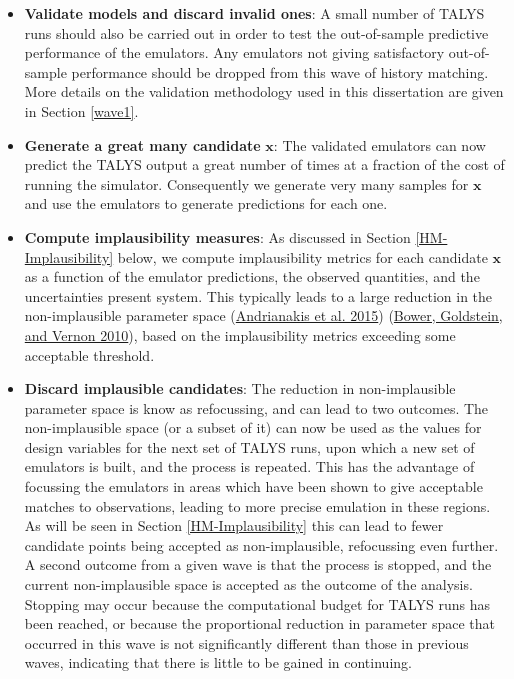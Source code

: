 \documentclass[
  12pt,
  a4paper,
  twoside]{book}
\begin{document}
\begin{itemize}
\item
  \textbf{Validate models and discard invalid ones}: A small number of TALYS runs should also be carried out in order to test the out-of-sample predictive performance of the emulators. Any emulators not giving satisfactory out-of-sample performance should be dropped from this wave of history matching. More details on the validation methodology used in this dissertation are given in Section \ref{wave1}.
\item
  \textbf{Generate a great many candidate} \(\mathbf{x}\): The validated emulators can now predict the TALYS output a great number of times at a fraction of the cost of running the simulator. Consequently we generate very many samples for \(\mathbf{x}\) and use the emulators to generate predictions for each one.
\item
  \textbf{Compute implausibility measures}: As discussed in Section \ref{HM-Implausibility} below, we compute implausibility metrics for each candidate \(\mathbf{x}\) as a function of the emulator predictions, the observed quantities, and the uncertainties present system. This typically leads to a large reduction in the non-implausible parameter space (\protect\hyperlink{ref-jeremy_histmatch}{Andrianakis et al. 2015}) (\protect\hyperlink{ref-bower2010galaxy}{Bower, Goldstein, and Vernon 2010}), based on the implausibility metrics exceeding some acceptable threshold.
\item
  \textbf{Discard implausible candidates}: The reduction in non-implausible parameter space is know as refocussing, and can lead to two outcomes. The non-implausible space (or a subset of it) can now be used as the values for design variables for the next set of TALYS runs, upon which a new set of emulators is built, and the process is repeated. This has the advantage of focussing the emulators in areas which have been shown to give acceptable matches to observations, leading to more precise emulation in these regions. As will be seen in Section \ref{HM-Implausibility} this can lead to fewer candidate points being accepted as non-implausible, refocussing even further. A second outcome from a given wave is that the process is stopped, and the current non-implausible space is accepted as the outcome of the analysis. Stopping may occur because the computational budget for TALYS runs has been reached, or because the proportional reduction in parameter space that occurred in this wave is not significantly different than those in previous waves, indicating that there is little to be gained in continuing.
\end{itemize}
\end{document}
